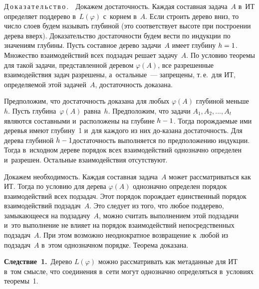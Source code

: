 \begin{multicols}{2}
  \smallskip
  
  \noindent
  Д\,о\,к\,а\,з\,а\,т\,е\,л\,ь\,с\,т\,в\,о\,.\ \ Докажем до\-ста\-точ\-ность. 
Каж\-дая со\-став\-ная задача~$A$ в~ИТ определяет поддерево в~$L(\varphi)$ с~корнем 
в~$A$. Если строить дерево вниз, то чис\-ло слоев будем называть глубиной (это 
соответствует высоте при по\-стро\-ении дерева вверх). Доказательство 
до\-ста\-точ\-ности будем вес\-ти по индукции по значениям глубины. Пусть со\-став\-ное 
дерево задачи~$A$ имеет глубину $h\hm = 1$. Множество взаимодействий всех 
подзадач решает задачу~$A$. По условию тео\-ре\-мы для такой задачи, 
пред\-став\-лен\-ной деревом $\varphi (A)$, все разрешенные взаимодействия задач 
разрешены, а~остальные~--- запрещены, т.\,е.\ для ИТ, опре\-де\-ля\-емой этой 
задачей~$A$, до\-ста\-точ\-ность доказана. 
  
  Предположим, что до\-ста\-точ\-ность доказана для любых $\varphi(A)$ глубиной 
меньше~$h$. Пусть глубина~$\varphi(A)$ рав\-на~$h$. Предположим, что задачи  
$A_1, A_2, \ldots ,A_t$ являются со\-став\-ны\-ми и~расположены на глубине $h\hm-1$. 
Тогда по\-рож\-да\-емые ими де\-ревья имеют глубину~1 и~для каж\-до\-го из них до-\linebreak казана 
до\-ста\-точ\-ность. Для дерева глубиной $h\hm-1$\linebreak до\-ста\-точ\-ность выполняется по 
предположению индукции. Тогда в~исходном дереве порядок всех взаимодействий 
однозначно определен и~разрешен. Остальные взаимодействия отсутствуют.
  
  Докажем необходимость. Каждая со\-став\-ная задача~$A$ может рассматриваться 
как ИТ. Тогда по условию для дерева $\varphi(A)$ однозначно определен порядок 
взаимодействий всех подзадач. Этот порядок порождает единственный порядок 
взаимодействий подзадач~$A$. Это следует из того, что любое поддерево, 
за\-мы\-ка\-юще\-еся на подзадачу~$A$, можно считать выполнением этой подзадачи 
и~это выполнение не влияет на порядок взаимодействий непосредственных 
подзадач~$A$. При этом возможно неоднократное возвращение к~любой из 
подзадач~$A$ в~этом однозначном порядке. Тео\-ре\-ма доказана.
  
  \smallskip
  
  \noindent
   \textbf{Следствие~1.}\ Дерево $L(\varphi)$ можно рас\-смат\-ри\-вать как 
метаданные для ИТ в~том смысле, что со\-еди\-не\-ния в~сети могут однозначно 
определяться в~условиях тео\-ре\-мы~1.

\vspace*{-6pt}
   

\end{multicols}
